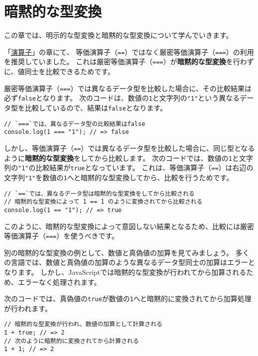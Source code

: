 \hypertarget{implicit-coercion}{%
\chapter{暗黙的な型変換}\label{implicit-coercion}}

この章では、明示的な型変換と暗黙的な型変換について学んでいきます。

「\href{../operator/README.md}{演算子}」の章にて、
等価演算子（\texttt{==}）ではなく厳密等価演算子（\texttt{===}）の利用を推奨していました。
これは厳密等価演算子（\texttt{===}）が\textbf{暗黙的な型変換}を行わずに、値同士を比較できるためです。

厳密等価演算子（\texttt{===}）では異なるデータ型を比較した場合に、その比較結果は必ず\texttt{false}となります。
次のコードは、数値の\texttt{1}と文字列の\texttt{"1"}という異なるデータ型を比較しているので、結果は\texttt{false}となります。

\begin{lstlisting}
// `===`では、異なるデータ型の比較結果はfalse
console.log(1 === "1"); // => false
\end{lstlisting}

しかし、等価演算子（\texttt{==}）では異なるデータ型を比較した場合に、同じ型となるように\textbf{暗黙的な型変換}をしてから比較します。
次のコードでは、数値の\texttt{1}と文字列の\texttt{"1"}の比較結果が\texttt{true}となっています。
これは、等価演算子（\texttt{==}）は右辺の文字列\texttt{"1"}を数値の\texttt{1}へと暗黙的な型変換してから、比較を行うためです。

\begin{lstlisting}
// `==`では、異なるデータ型は暗黙的な型変換をしてから比較される
// 暗黙的な型変換によって 1 == 1 のように変換されてから比較される
console.log(1 == "1"); // => true
\end{lstlisting}

このように、暗黙的な型変換によって意図しない結果となるため、比較には厳密等価演算子（\texttt{===}）を使うべきです。

別の暗黙的な型変換の例として、数値と真偽値の加算を見てみましょう。
多くの言語では、数値と真偽値の加算のような異なるデータ型同士の加算はエラーとなります。
しかし、JavaScriptでは暗黙的な型変換が行われてから加算されるため、エラーなく処理されます。

次のコードでは、真偽値の\texttt{true}が数値の\texttt{1}へと暗黙的に変換されてから加算処理が行われます。

\begin{lstlisting}
// 暗黙的な型変換が行われ、数値の加算として計算される
1 + true; // => 2
// 次のように暗黙的に変換されてから計算される
1 + 1; // => 2
\end{lstlisting}

